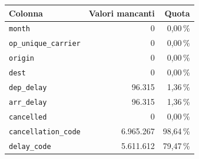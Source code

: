 \begin{tabular}{@{}l r r@{}}
\toprule
Colonna & Valori mancanti & Quota \\
\midrule
\texttt{month} & 0 & 0,00\,\% \\
\texttt{op\_unique\_carrier} & 0 & 0,00\,\% \\
\texttt{origin} & 0 & 0,00\,\% \\
\texttt{dest} & 0 & 0,00\,\% \\
\texttt{dep\_delay} & 96.315 & 1,36\,\% \\
\texttt{arr\_delay} & 96.315 & 1,36\,\% \\
\texttt{cancelled} & 0 & 0,00\,\% \\
\texttt{cancellation\_code} & 6.965.267 & 98,64\,\% \\
\texttt{delay\_code} & 5.611.612 & 79,47\,\% \\
\bottomrule
\end{tabular}